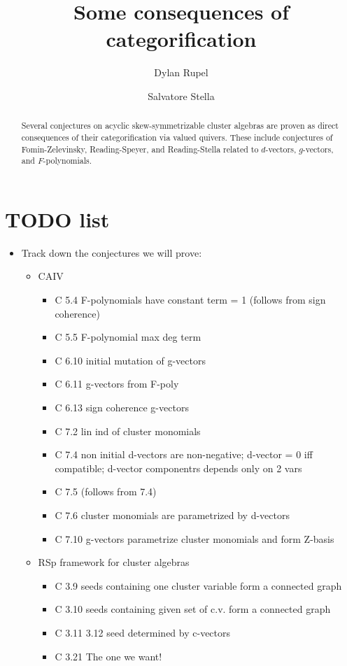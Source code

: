 \documentclass{amsart}
\title{Some consequences of categorification}
\author[Rupel]{Dylan Rupel}
\author[Stella]{Salvatore Stella}
\begin{document}
  \begin{abstract}
    Several conjectures on acyclic skew-symmetrizable cluster algebras are proven as direct consequences of their categorification via valued quivers.  These include conjectures of Fomin-Zelevinsky, Reading-Speyer, and Reading-Stella related to $d$-vectors, $g$-vectors, and $F$-polynomials.
  \end{abstract}
  \maketitle

  \section{TODO list}
  \begin{itemize}
    \item
      Track down the conjectures we will prove:
		
		\begin{itemize}
		  \item CAIV
        \begin{itemize}
          \item C 5.4	F-polynomials have constant term = 1 (follows from sign coherence)
          \item C 5.5	F-polynomial max deg term
          \item C 6.10	initial mutation of g-vectors
          \item C 6.11	g-vectors from F-poly
          \item C 6.13	sign coherence g-vectors
          \item C 7.2	lin ind of cluster monomials
          \item C 7.4	non initial d-vectors are non-negative; d-vector = 0 iff compatible; 	d-vector componentrs depends only on 2 vars
          \item C 7.5	(follows from 7.4)
          \item C 7.6	cluster monomials are parametrized by d-vectors
          \item C 7.10	g-vectors parametrize cluster monomials and form Z-basis
        \end{itemize}
      
      \item RSp framework for cluster algebras
        \begin{itemize}
          \item   C 3.9		seeds containing one cluster variable form a connected graph
          \item   C 3.10		seeds containing given set of c.v. form a connected graph
          \item   C 3.11 3.12	seed determined by c-vectors
          \item   C 3.21		The one we want!
        \end{itemize}
    \end{itemize}



\end{itemize}
\end{document}
